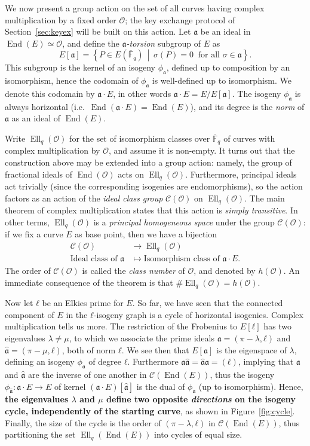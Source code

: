 \documentclass{article}
\newcommand{\Fbar}{\overline{\mathbb{F}}}
\newcommand{\Cl}{\mathcal{C}}
\renewcommand{\O}{\mathcal{O}}
\newcommand{\set}[1]{\left\{#1\right\}}
\newcommand{\suchthat}{\,\middle\vert\,}
\renewcommand{\frak}{\mathfrak}
\theoremstyle{definition}
\DeclareMathOperator{\End}{End}
\DeclareMathOperator{\Ell}{Ell}
\begin{document}
We now present a group action on the set of all curves having complex
multiplication by a fixed order $\O$; the key exchange protocol of
Section~\ref{sec:keyex} will be built on this action. Let $\frak a$ be
an ideal in $\End(E)≃\O$, and define the
\emph{${\frak a}$-torsion} subgroup of $E$ as
\[
E[\frak a] = \set{P\in E(\Fbar_q) \suchthat \sigma(P) = 0\ 
\text{ for all }\sigma\in\frak a}.
\]
This subgroup is the kernel of an isogeny $\phi_{\frak a}$, defined up
to composition by an isomorphism, hence the codomain of
$\phi_{\frak a}$ is well-defined up to isomorphism.  We denote this
codomain by $\frak a\cdot E$, in other words
$\frak a\cdot E = E/E[\frak a]$.  The isogeny $\phi_{\frak a}$ is
always horizontal (i.e.\ $\End(\frak a \cdot E) = \End(E)$), and its
degree is the \emph{norm} of $\frak a$ as an ideal of $\End(E)$.

Write $\Ell_q(\O)$ for the set of isomorphism classes over $\Fbar_q$
of curves with complex multiplication by $\O$, and assume it is
non-empty. It turns out that the construction above may be extended
into a group action: namely, the group of fractional ideals of
$\End(\O)$ acts on $\Ell_q(\O)$. Furthermore, principal ideals act
trivially (since the corresponding isogenies are endomorphisms), 
so the action factors as an action of the \emph{ideal
  class group} $\Cl(\O)$ on $\Ell_q(\O)$.  The main theorem of complex
multiplication states that this action is \emph{simply transitive}. In
other terms, $\Ell_q(\O)$ is a \emph{principal homogeneous space}
under the group $\Cl(\O)$: if we fix a curve $E$ as base point,
then we have a bijection
\[
\begin{aligned}
\Cl(\O) &\longrightarrow \Ell_q(\O) \\
\text{Ideal class of }\frak a &\longmapsto \text{Isomorphism class of }\frak a\cdot E.
\end{aligned}
\]
The order of $\Cl(\O)$ is called the \emph{class number} of $\O$, and
denoted by $h(\O)$. An immediate consequence of the theorem is that
$\#\Ell_q(\O)=h(\O)$.

Now let $ℓ$ be an Elkies prime for $E$. So far, we have seen that the
connected component of $E$ in the $ℓ$-isogeny graph is a cycle of
horizontal isogenies. Complex multiplication tells us more. The
restriction of the Frobenius to $E[ℓ]$ has two eigenvalues $λ≠μ$, to
which we associate the prime ideals $\frak a=(π-λ,ℓ)$ and
$\hat{\frak a}=(π-μ,ℓ)$, both of norm $ℓ$. We see then that
$E[\frak a]$ is the eigenspace of $λ$, defining an isogeny
$ϕ_{\frak{a}}$ of degree $ℓ$. Furthermore
$\frak a\hat{\frak a} = \hat{\frak a}\frak a = (ℓ)$, implying that
$\frak a$ and $\hat{\frak a}$ are the inverse of one another in
$\Cl(\End(E))$, thus the isogeny $ϕ_{\hat{\frak a}}:\frak a·E→E$ of
kernel $(\frak a·E)[\hat{\frak a}]$ is the dual of $ϕ_{\frak a}$ (up
to isomorphism). Hence, 
\textbf{the eigenvalues $λ$ and $μ$ define two opposite
  \emph{directions} on the isogeny cycle, independently of the
  starting curve}, as shown in Figure~\ref{fig:cycle}.  Finally, the
size of the cycle is the order of $(π-λ,ℓ)$ in $\Cl(\End(E))$, thus
partitioning the set $\Ell_q(\End(E))$ into cycles of equal size.
\end{document}
